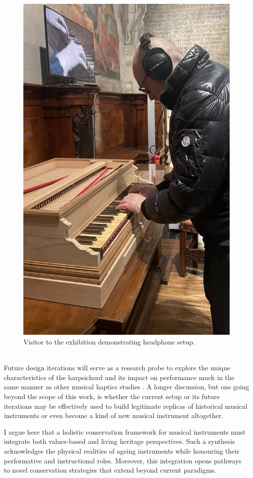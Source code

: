 \begin{figure}
    \centering
    \includegraphics[width=0.33\linewidth]{img/exhibition-user-1.jpeg}
    \caption{Visitor to the exhibition demonstrating headphone setup.}
    \label{fig:user}
\end{figure}
\\


Future design iterations will serve as a research probe to explore the unique characteristics of the harpsichord and its impact on performance much in the same manner as other musical haptics studies \cite{charalampos-saitis_musical_2018}. A longer discussion, but one going beyond the scope of this work, is whether the current setup or its future iterations may be effectively used to build legitimate replicas of historical musical instruments or even become a kind of new musical instrument altogether.

I argue here that a holistic conservation framework for musical instruments must integrate both values-based and living heritage perspectives. Such a synthesis acknowledges the physical realities of ageing instruments while honouring their performative and instructional roles. Moreover, this integration opens pathways to novel conservation strategies that extend beyond current paradigms.
